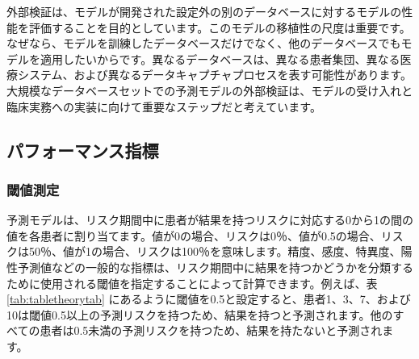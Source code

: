 \documentclass[
  11pt]{book}
\theoremstyle{definition}
\theoremstyle{definition}
\theoremstyle{definition}
\theoremstyle{definition}
\theoremstyle{remark}
\begin{document}
外部検証は、モデルが開発された設定外の別のデータベースに対するモデルの性能を評価することを目的としています。このモデルの移植性の尺度は重要です。なぜなら、モデルを訓練したデータベースだけでなく、他のデータベースでもモデルを適用したいからです。異なるデータベースは、異なる患者集団、異なる医療システム、および異なるデータキャプチャプロセスを表す可能性があります。大規模なデータベースセットでの予測モデルの外部検証は、モデルの受け入れと臨床実務への実装に向けて重要なステップだと考えています。

\subsection{パフォーマンス指標}\label{performance}

\subsubsection*{閾値測定}\label{ux95beux5024ux6e2cux5b9a}

予測モデルは、リスク期間中に患者が結果を持つリスクに対応する0から1の間の値を各患者に割り当てます。値が0の場合、リスクは0％、値が0.5の場合、リスクは50％、値が1の場合、リスクは100％を意味します。精度、感度、特異度、陽性予測値などの一般的な指標は、リスク期間中に結果を持つかどうかを分類するために使用される閾値を指定することによって計算できます。例えば、表 \ref{tab:tabletheorytab} にあるように閾値を0.5と設定すると、患者1、3、7、および10は閾値0.5以上の予測リスクを持つため、結果を持つと予測されます。他のすべての患者は0.5未満の予測リスクを持つため、結果を持たないと予測されます。     
\end{document}
